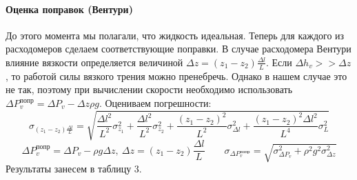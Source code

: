 \documentclass[a4paper, 12pt]{article}
\begin{document}
\paragraph{Оценка поправок (Вентури)}
До этого момента мы полагали, что жидкость идеальная. Теперь для каждого из расходомеров сделаем соответствующие поправки. В случае расходомера Вентури влияние вязкости определяется величиной $\Delta z = (z_1 - z_2) \frac{\Delta l}{L}$. Если $\Delta h_v >> \Delta z$, то работой силы вязкого трения можно пренебречь. Однако в нашем случае это не так, поэтому при вычислении скорости необходимо использовать $\Delta P_v^{попр} = \Delta P_v - \Delta z \rho g$.
Оцениваем погрешности:
\[ \sigma_{(z_1-z_2) \frac{\Delta l}{L}} = \sqrt{\frac{\Delta l^2}{L^2}\sigma_{z_1}^2 + \frac{\Delta l^2}{L^2}\sigma_{z_2}^2 + \frac{(z_1 - z_2)^2}{L^2}\sigma_{\Delta l}^2 + \frac{(z_1 - z_2)^2 \Delta l^2}{L^4}\sigma_{L}^2}\]
\[ \Delta P_v^{попр} = \Delta P_v - \rho g \Delta z, \: \Delta z = (z_1 - z_2) \frac{\Delta l}{L} \qquad \sigma_{\Delta P_v^{попр}} = \sqrt{\sigma_{\Delta P_v}^2 + \rho^2 g^2 \sigma_{\Delta z}^2}\]
Результаты занесем в таблицу 3.
\end{document}
